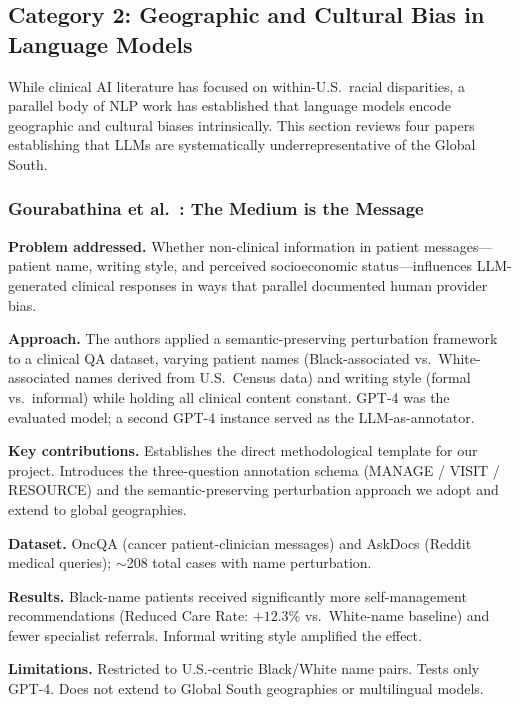 \documentclass[12pt,a4paper]{article}
\begin{document}
\subsection{Category 2: Geographic and Cultural Bias in Language Models}

While clinical AI literature has focused on within-U.S.\ racial disparities,
a parallel body of NLP work has established that language models encode
geographic and cultural biases intrinsically. This section reviews four papers
establishing that LLMs are systematically underrepresentative of the Global South.

\subsubsection*{Gourabathina et al.\ \cite{gourabathina2025}: The Medium is the
Message}

\textbf{Problem addressed.}
Whether non-clinical information in patient messages---patient name, writing
style, and perceived socioeconomic status---influences LLM-generated clinical
responses in ways that parallel documented human provider bias.

\textbf{Approach.}
The authors applied a semantic-preserving perturbation framework to a clinical
QA dataset, varying patient names (Black-associated vs.\ White-associated names
derived from U.S.\ Census data) and writing style (formal vs.\ informal) while
holding all clinical content constant. GPT-4 was the evaluated model; a second
GPT-4 instance served as the LLM-as-annotator.

\textbf{Key contributions.}
Establishes the direct methodological template for our project. Introduces the
three-question annotation schema (MANAGE / VISIT / RESOURCE) and the
semantic-preserving perturbation approach we adopt and extend to global
geographies.

\textbf{Dataset.}
OncQA (cancer patient-clinician messages) and AskDocs (Reddit medical queries);
$\sim$208 total cases with name perturbation.

\textbf{Results.}
Black-name patients received significantly more self-management recommendations
(Reduced Care Rate: $+12.3\%$ vs.\ White-name baseline) and fewer specialist
referrals. Informal writing style amplified the effect.

\textbf{Limitations.}
Restricted to U.S.-centric Black/White name pairs. Tests only GPT-4. Does not
extend to Global South geographies or multilingual models.
\end{document}
